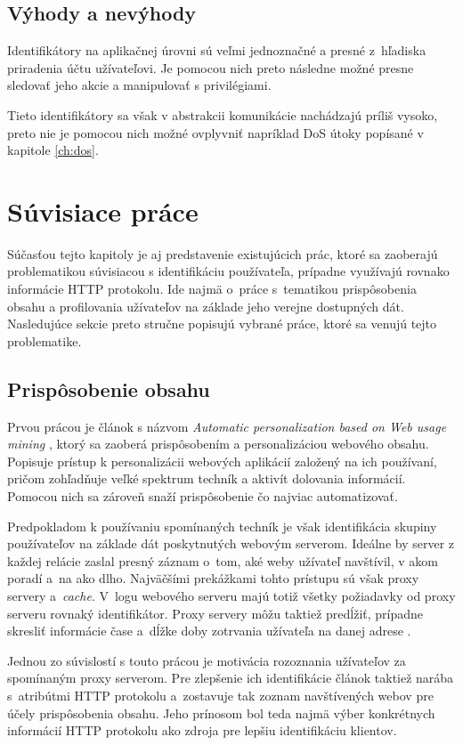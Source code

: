 \documentclass[
  printed, %
  table,   %
  lof,     %
  nolot,   %
  nocover
]{fithesis3}
\begin{document}
\subsection{Výhody a nevýhody}
Identifikátory na aplikačnej úrovni sú veľmi jednoznačné a presné z~hľadiska
priradenia účtu užívateľovi. Je pomocou nich preto následne možné presne
sledovať jeho akcie a manipulovať s privilégiami.

Tieto identifikátory sa však v abstrakcii komunikácie nachádzajú príliš vysoko,
preto nie je pomocou nich možné ovplyvniť napríklad DoS útoky popísané v
kapitole \ref{ch:dos}.

\section{Súvisiace práce}
Súčasťou tejto kapitoly je aj predstavenie existujúcich prác, ktoré sa zaoberajú 
problematikou súvisiacou s identifikáciu používateľa, prípadne využívajú rovnako
informácie HTTP protokolu. Ide najmä o~práce s~tematikou prispôsobenia obsahu a
profilovania užívateľov na základe jeho verejne dostupných dát. Nasledujúce sekcie 
preto stručne popisujú vybrané práce, ktoré sa venujú tejto problematike.

\subsection{Prispôsobenie obsahu}
Prvou prácou je článok s názvom \textit{Automatic personalization based on Web usage mining} \cite{Mobasher:2000:APB},
ktorý sa zaoberá prispôsobením a personalizáciou webového obsahu. Popisuje prístup k personalizácii webových
aplikácií založený na ich používaní, pričom zohľadňuje veľké spektrum techník a aktivít dolovania informácií.
Pomocou nich sa zároveň snaží prispôsobenie čo najviac automatizovať.

Predpokladom k používaniu spomínaných techník je však identifikácia skupiny používateľov na
základe dát poskytnutých webovým serverom. Ideálne by server z každej relácie zaslal presný záznam o~tom, 
aké weby užívateľ navštívil, v akom poradí a~na ako dlho. Najväčšími prekážkami tohto prístupu sú však proxy
servery a~\textit{cache}. V~logu webového serveru majú totiž všetky požiadavky od proxy serveru
rovnaký identifikátor. Proxy servery môžu taktiež predĺžiť, prípadne skresliť informácie čase a~dĺžke doby
zotrvania užívateľa na danej adrese \cite{Mobasher:2000:APB}.

Jednou zo súvislostí s touto prácou je motivácia rozoznania užívateľov za spomínaným proxy serverom.
Pre zlepšenie ich identifikácie článok taktiež narába s~atribútmi HTTP protokolu a~zostavuje
tak zoznam navštívených webov pre účely prispôsobenia obsahu. Jeho prínosom bol teda najmä výber konkrétnych 
informácií HTTP protokolu ako zdroja pre lepšiu identifikáciu klientov.
\end{document}
